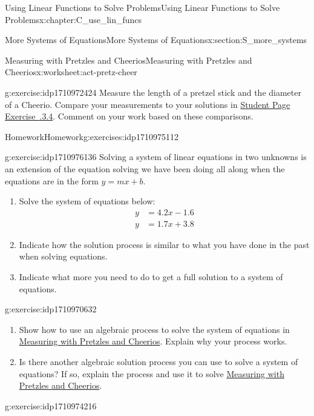 \documentclass[oneside,10pt,]{book}
\newcommand{\xreffont}{\relax}
\numberwithin{equation}{chapter}
\newcommand{\amp}{&}
\begin{document}
\begin{chapterptx}{Using Linear Functions to Solve Problems}{}{Using Linear Functions to Solve Problems}{}{}{x:chapter:C_use_lin_funcs}
\begin{sectionptx}{More Systems of Equations}{}{More Systems of Equations}{}{}{x:section:S_more_systems}
\begin{worksheet-subsection}{Measuring with Pretzles and Cheerios}{}{Measuring with Pretzles and Cheerios}{}{}{x:worksheet:act-pretz-cheer}
\begin{divisionexercise}{6}{}{}{g:exercise:idp1710972424}
Measure the length of a pretzel stick and the diameter of a Cheerio. Compare your measurements to your solutions in \hyperlink{x:exercise:exer-pretz-intersect}{Student Page Exercise~{\xreffont 3.6.3.4}}. Comment on your work based on these comparisons.%
\end{divisionexercise}%
\end{worksheet-subsection}
\restoregeometry
%
%
\typeout{************************************************}
\typeout{************************************************}
%
\begin{exercises-subsection}{Homework}{}{Homework}{}{}{g:exercises:idp1710975112}
\begin{divisionexercise}{1}{}{}{g:exercise:idp1710976136}%
Solving a system of linear equations in two unknowns is an extension of the equation solving we have been doing all along when the equations are in the form \(y = mx + b\).%
\begin{enumerate}[font=\bfseries,label=(\alph*),ref=\alph*]
\item{}Solve the system of equations below:%
\begin{align*}
y \amp = 4.2x - 1.6\\
y \amp = 1.7x + 3.8
\end{align*}
%
\item{}Indicate how the solution process is similar to what you have done in the past when solving equations.%
\item{}Indicate what more you need to do to get a full solution to a system of equations.%
\end{enumerate}
\end{divisionexercise}%
\begin{divisionexercise}{2}{}{}{g:exercise:idp1710970632}%
\begin{enumerate}[font=\bfseries,label=(\alph*),ref=\alph*]
\item{}Show how to use an algebraic process to solve the system of equations in \hyperref[x:worksheet:act-pretz-cheer]{Measuring with Pretzles and Cheerios}. Explain why your process works.%
\item{}Is there another algebraic solution process you can use to solve a system of equations? If so, explain the process and use it to solve \hyperref[x:worksheet:act-pretz-cheer]{Measuring with Pretzles and Cheerios}.%
\end{enumerate}
\end{divisionexercise}%
\begin{divisionexercise}{3}{}{}{g:exercise:idp1710974216}%

\end{divisionexercise}
\end{exercises-subsection}
\end{sectionptx}
\end{chapterptx}
\end{document}
